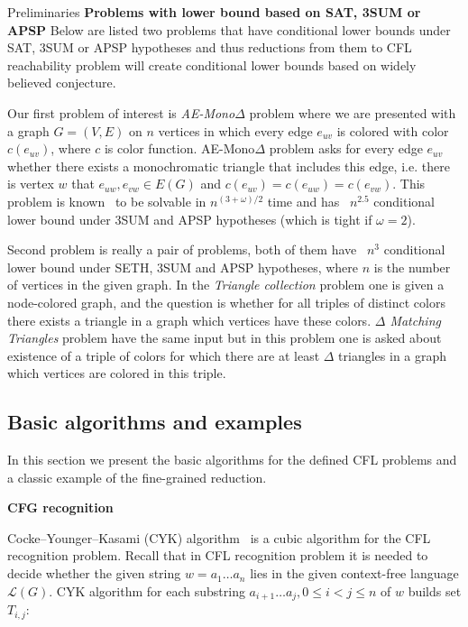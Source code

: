\documentclass[12pt]{article}
\begin{document}
\begin{section}{Preliminaries}
\textbf{Problems with lower bound based on SAT, 3SUM or APSP}
	Below are listed two problems that have conditional lower bounds under SAT, 3SUM or APSP hypotheses and thus reductions from them to CFL reachability problem will create conditional lower bounds based on widely believed conjecture.
	
	Our first problem of interest is \textit{AE-Mono$\Delta$} problem where we are presented with a graph $G = (V, E)$ on $n$ vertices in which every edge $e_{uv}$ is colored with color $c(e_{uv})$, where $c$ is color function. AE-Mono$\Delta$ problem asks for every edge $e_{uv}$ whether there exists a monochromatic triangle that includes this edge, i.e. there is vertex $w$ that $e_{uw}, e_{vw} \in E(G)$ and $c(e_{uv}) = c(e_{uw}) = c(e_{vw})$. This problem is known~\cite{10.1007/11786986_24, 10.1145/1798596.1798597} to be solvable in $n^{(3 + \omega) / 2}$ time and has~\cite{https://doi.org/10.4230/lipics.itcs.2020.53} $n^{2.5}$ conditional lower bound under 3SUM and APSP hypotheses (which is tight if $\omega = 2$).
	
	Second problem is really a pair of problems, both of them have~\cite{10.1145/2746539.2746594} $n^{3}$ conditional lower bound under SETH, 3SUM and APSP hypotheses, where $n$ is the number of vertices in the given graph. In the \textit{Triangle collection} problem one is given a node-colored graph, and the question is whether for all triples of distinct colors there exists a triangle in a graph which vertices have these colors. \textit{$\Delta$ Matching Triangles} problem have the same input but in this problem one is asked about existence of a triple of colors for which there are at least $\Delta$ triangles in a graph which vertices are colored in this triple.

\subsection{Basic algorithms and examples}
\label{subsec:basic}

In this section we present the basic algorithms for the defined CFL problems and a classic example of the fine-grained reduction.

\textbf{CFG recognition}

Cocke–Younger–Kasami (CYK) algorithm~\cite{10.5555/524279} is a cubic algorithm for the CFL recognition problem. Recall that in CFL recognition problem it is needed to decide whether the given string $w = a_1 \ldots a_n$ lies in the given context-free language $\mathcal{L}(G)$. CYK algorithm for each substring $a_{i + 1} \ldots a_j, 0 \le i < j \le n$ of $w$ builds set $T_{i, j}$:


\end{section}
\end{document}
